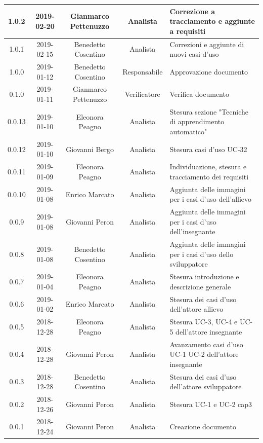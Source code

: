 \documentclass[11pt,a4paper]{article}
\begin{document}
{\begin{tabularx}{\textwidth}{ c | c | c | c | X }
		1.0.2 & 2019-02-20 & Gianmarco Pettenuzzo & Analista & Correzione a tracciamento e aggiunte a requisiti\\ \hline
		1.0.1 & 2019-02-15 & Benedetto Cosentino & Analista & Correzioni e aggiunte di nuovi casi d'uso \\ \hline
		1.0.0 & 2019-01-12 & Benedetto Cosentino & Responsabile & Approvazione documento \\ \hline
		0.1.0 & 2019-01-11 & Gianmarco Pettenuzzo & Verificatore & Verifica documento \\ \hline
		0.0.13 & 2019-01-10 & Eleonora Peagno & Analista & Stesura sezione "Tecniche di apprendimento automatico" \\ \hline
		0.0.12 & 2019-01-10 & Giovanni Bergo & Analista & Stesura casi d'uso UC-32 \\ \hline
		0.0.11 & 2019-01-09 & Eleonora Peagno & Analista & Individuazione, stesura e tracciamento dei requisiti \\ \hline
		0.0.10 & 2019-01-08 & Enrico Marcato & Analista & Aggiunta delle immagini per i casi d'uso dell'allievo\\ \hline
		0.0.9 & 2019-01-08 & Giovanni Peron & Analista & Aggiunta delle immagini per i casi d'uso dell'insegnante\\ \hline
		0.0.8 & 2019-01-08 & Benedetto Cosentino & Analista & Aggiunta delle immagini per i casi d'uso dello sviluppatore\\ \hline
		0.0.7 & 2019-01-04 & Eleonora Peagno & Analista & Stesura introduzione e descrizione generale\\ \hline
		0.0.6 & 2019-01-02 & Enrico Marcato & Analista & Stesura dei casi d'uso dell'attore allievo\\ \hline
		0.0.5 & 2018-12-28 & Eleonora Peagno & Analista & Stesura UC-3, UC-4 e UC-5 dell'attore insegnante\\ \hline
		0.0.4 & 2018-12-28 & Giovanni Peron & Analista & Avanzamento casi d'uso UC-1 UC-2 dell'attore insegnante\\ \hline
		0.0.3 & 2018-12-28 & Benedetto Cosentino & Analista & Stesura dei casi d'uso dell'attore sviluppatore\\ \hline
		0.0.2 & 2018-12-26 & Giovanni Peron & Analista & Stesura UC-1 e UC-2 cap3\\ \hline
		0.0.1 & 2018-12-24 & Giovanni Peron & Analista & Creazione documento\\ \hline
	\end{tabularx}
	\newpage
	\tableofcontents
	\listoffigures
	\listoftables
	\newpage	
}
\end{document}
